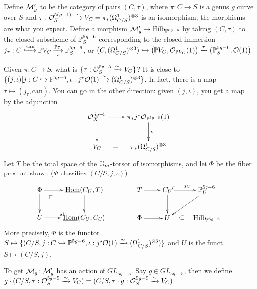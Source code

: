  Define $\mathcal{M}_g'$ to be the category of pairs $(C,\tau)$, where $\pi:C\to S$ is a genus $g$ curve over $S$ and $\tau:\mathcal{O}_S^{5(g-1)}\xrightarrow\sim V_C=\pi_*(\Omega^1_{C/S})^{\otimes 3}$ is an isomorphism; the morphisms are what you expect. Define a morphism $\mathcal{M}_g'\to \operatorname{Hilb}_{\mathbb{P}^{5g-6}}$ by taking $(C,\tau)$ to the closed subscheme of $\mathbb{P}_S^{5g-6}$ corresponding to the closed immersion $j_\tau:C\xhookrightarrow{\text{can}} \mathbb{P} V_C\xrightarrow[\sim]{\mathbb{P}\tau} \mathbb{P}_S^{5g-6}$, or $\bigl(C,(\Omega^1_{C/S})^{\otimes 3})\hookrightarrow \bigl(\mathbb{P} V_C,\mathcal{O}_{\mathbb{P} V_C}(1)\bigr)\xrightarrow\tau \bigl(\mathbb{P}_S^{5g-6},\mathcal{O}(1)\bigr)$ 
 
 Given $\pi:C\to S$, what is $\{\tau:\mathcal{O}_S^{5g-5}\xrightarrow\sim V_C\}$? It is close to $\{(j,\iota)|j:C\hookrightarrow \mathbb{P}^{5g-6},\iota:j^\star\mathcal{O}(1)\xrightarrow\sim (\Omega^1_{C/S})^{\otimes 3}\}$. In fact, there is a map $\tau\mapsto (j_\tau,\text{can})$. You can go in the other direction: given $(j,\iota)$, you get a map by the adjunction
 \[\xymatrix{
   \O_X^{5g-5}\ar[r]\ar@{.>}[d] & \pi_*j^*\O_{\PP^{5g-6}}(1)\ar[d]^\iota\\
   V_C\ar@{}[r]|<>(.5){\mbox{$=$}} & \pi_*(\Om^1_{C/S})^{\otimes 3}
 }\]
 Let $T$ be the total space of the $\mathbb{G}_m$-torsor of isomorphisms, and let $\Phi$ be the fiber product shown ($\Phi$ classifies $(C/S,j,\iota)$)
 \[\xymatrix{
  \Phi\ar[r]\ar[d]\ar@{}[dr]|(.25)\pb & \uhom(C_U,T)\ar[d]\\
  U\ar[r]^\id & \uhom(C_U,C_U)
 }\qquad\qquad \xymatrix{
  T\ar[r] & C_U \ar@{^(->}[r]^{j_U}\ar[d] & \PP^{5g-6}_U\ar[dl]\\
  \Phi\ar[r] & U\ar@{}[r]|<>(.5){\mbox{$\subseteq$}} & \hilb_{\PP^{5g-6}}
 }\]
 More precisely, $\Phi$ is the functor $S\mapsto \{(C/S,j:C\hookrightarrow \mathbb{P}^{5g-6},\iota:j^\star\mathcal{O}(1)\xrightarrow\sim (\Omega^1_{C/S})^{\otimes 3})\}$ and $U$ is the funct $S\mapsto (C/S,j)$.

 To get $\mathcal{M}_g$: $\mathcal{M}_g'$ has an action of $GL_{5g-5}$. Say $g\in GL_{5g-5}$, then we define $g\cdot (C/S,\tau:\mathcal{O}^{5g-5}_S\xrightarrow\sim V_C)=(C/S,\tau\cdot g:\mathcal{O}_S^{5g-5}\xrightarrow\sim V_C)$
